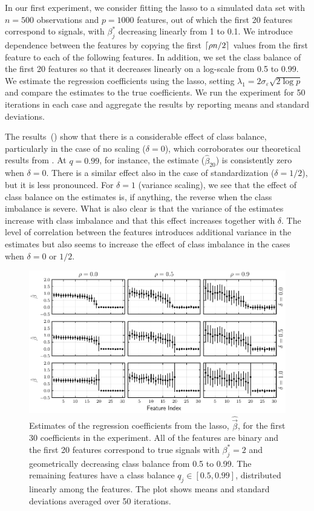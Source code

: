 In our first experiment, we consider fitting the lasso to a simulated data set with \(n=500\) observations and \(p = \num{1000}\) features, out of which the first 20 features correspond to signals, with \(\beta_j^*\) decreasing linearly from 1 to 0.1.
We introduce dependence between the features by copying the first \(\lceil \rho n/2 \rceil\) values from the first feature to each of the following features.
In addition, we set the class balance of the first 20 features so that it decreases linearly on a log-scale from 0.5 to 0.99.
We estimate the regression coefficients using the lasso, setting \(\lambda_1 = 2 \sigma_\varepsilon \sqrt{2 \log p }\) and compare the estimates to the true coefficients. We run the experiment for 50 iterations in each case and aggregate the results by reporting means and standard deviations.

The results~() show that there is a considerable effect of class balance, particularly in the case of no scaling (\(\delta = 0\)), which corroborates our theoretical results from . At \(q=0.99\), for instance, the estimate (\(\hat{\beta}_{20}\)) is consistently zero when \(\delta = 0\). There is a similar effect also in the case of standardization (\(\delta = 1/2\)), but it is less pronounced. For \(\delta=1\) (variance scaling), we see that the effect of class balance on the estimates is, if anything, the reverse when the class imbalance is severe. What is also clear is that the variance of the estimates increase with class imbalance and that this effect increases together with \(\delta\). The level of correlation between the features introduces additional variance in the estimates but also seems to increase the effect of class imbalance in the cases when \(\delta = 0\) or \(1/2\).

\begin{figure}[htpb]
  \centering
  \includegraphics[]{plots/binary_decreasing.pdf}
  \caption{%
    Estimates of the regression coefficients from the lasso, \(\hat{\vec{\beta}}\), for the first 30 coefficients in the experiment. All of the features are binary and the first 20 features correspond to true signals with \(\beta_j^* = 2\) and geometrically decreasing class balance from 0.5 to 0.99. The remaining features have a class balance \(q_j \in [0.5, 0.99]\), distributed linearly among the features. The plot shows means and standard deviations averaged over 50 iterations.}
  \label{fig:binary-decreasing}
\end{figure}

